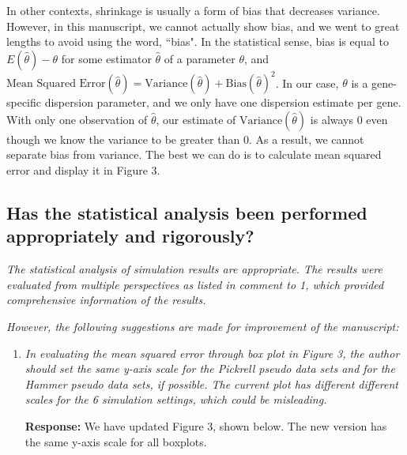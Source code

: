 \documentclass{article}
\providecommand{\q}{$\quad$ \newline}
\providecommand{\wh}[1]{\widehat{#1}}
\begin{document}
\begin{flushleft}
\begin{enumerate}
In other contexts, shrinkage is usually a form of bias that decreases variance. However, in this manuscript, we cannot actually show bias, and we went to great lengths to avoid using the word, ``bias". In the statistical sense, bias is equal to $E ( \wh{\theta} ) - \theta$ for some estimator $\wh{\theta}$ of a parameter $\theta$, and $\text{Mean Squared Error}(\wh{\theta}) = \text{Variance}(\wh{\theta}) + \text{Bias}(\wh{\theta})^2$. In our case, $\theta$ is a gene-specific dispersion parameter, and we only have one dispersion estimate per gene. With only one observation of $\wh{\theta}$, our estimate of $\text{Variance}(\wh{\theta})$ is always 0 even though we know the variance to be greater than 0. As a result, we cannot separate bias from variance. The best we can do is to calculate mean squared error and display it in Figure 3.


\end{enumerate}
























\subsection{Has the statistical analysis been performed appropriately and rigorously?}

\emph{ The statistical analysis of simulation results are appropriate. The results were evaluated from multiple perspectives as listed in comment to 1, which provided comprehensive information of the results.} \q

\emph{However, the following suggestions are made for improvement of the manuscript:}

\begin{enumerate}
\item \emph{In evaluating the mean squared error through box plot in Figure 3, the author should set the same y-axis scale for the Pickrell pseudo data sets and for the Hammer pseudo data sets, if possible. The current plot has different different scales for the 6 simulation settings, which could be misleading.} \q

{\bf Response:} We have updated Figure 3, shown below. The new version has the same y-axis scale for all boxplots. 


\end{enumerate}
\end{flushleft}
\end{document}
